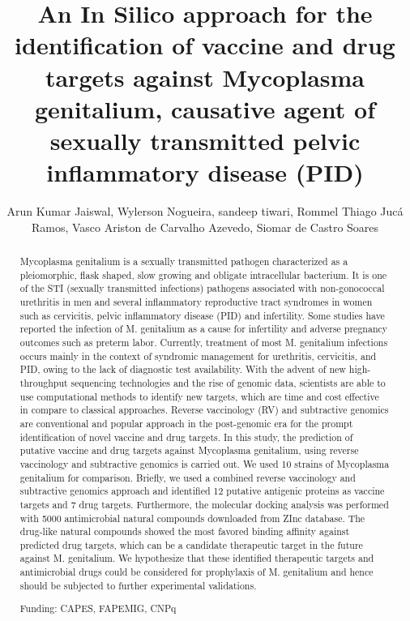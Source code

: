 \documentclass[twoside]{article}
\title{\vspace{-15mm}\fontsize{24pt}{10pt}\selectfont\textbf{ An In Silico approach for the identification of vaccine and drug targets against Mycoplasma genitalium,  causative agent of sexually transmitted pelvic inflammatory disease (PID) }} %
\author{ Arun Kumar Jaiswal, Wylerson Nogueira, sandeep tiwari, Rommel Thiago Juc\'a Ramos, Vasco Ariston de Carvalho Azevedo, Siomar de Castro Soares }
\affil{ Universidade Federal do Tri\^angulo Mineiro }
\date{}
\begin{document}
  
  
  \maketitle %
  
  
  \thispagestyle{fancy} %
  
  
  \begin{abstract}
  Mycoplasma genitalium is a sexually transmitted pathogen characterized as a pleiomorphic,  flask shaped,  slow growing and obligate intracellular bacterium. It is one of the STI (sexually transmitted infections) pathogens associated with non-gonococcal urethritis in men and several inflammatory reproductive tract syndromes in women such as cervicitis,  pelvic inflammatory disease (PID) and infertility. Some studies have reported the infection of M. genitalium as a cause for infertility and adverse pregnancy outcomes such as preterm labor. Currently,  treatment of most M. genitalium infections occurs mainly in the context of syndromic management for urethritis,  cervicitis,  and PID,  owing to the lack of diagnostic test availability. With the advent of new high-throughput sequencing technologies and the rise of genomic data,  scientists are able to use computational methods to identify new targets,  which are time and cost effective in compare to classical approaches. Reverse vaccinology (RV) and subtractive genomics are conventional and popular approach in the post-genomic era for the prompt identification of novel vaccine and drug targets. In this study,  the prediction of putative vaccine and drug targets against Mycoplasma genitalium,  using reverse vaccinology and subtractive genomics is carried out. We used 10 strains of Mycoplasma genitalium for comparison. Briefly,  we used a combined reverse vaccinology and subtractive genomics approach and identified 12 putative antigenic proteins as vaccine targets and 7 drug targets. Furthermore,  the molecular docking analysis was performed with 5000 antimicrobial natural compounds downloaded from ZInc database. The drug-like natural compounds showed  the most  favored binding affinity against predicted drug targets,  which can be a candidate therapeutic target in the future against M. genitalium. We hypothesize that these identified therapeutic targets and antimicrobial drugs could be considered for prophylaxis of M. genitalium and hence should be subjected to further experimental validations.
  
  Funding: CAPES,  FAPEMIG,  CNPq \\ 
  \end{abstract}
  
\end{document}
